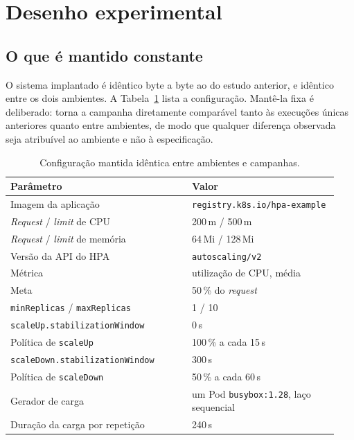 \documentclass[conference]{IEEEtran}
\begin{document}
\section{Desenho experimental}
\label{sec:desenho}

\subsection{O que é mantido constante}

O sistema implantado é idêntico byte a byte ao do estudo anterior, e idêntico
entre os dois ambientes. A Tabela~\ref{tab:config} lista a configuração.
Mantê-la fixa é deliberado: torna a campanha diretamente comparável tanto às
execuções únicas anteriores quanto entre ambientes, de modo que qualquer
diferença observada seja atribuível ao ambiente e não à especificação.

\begin{table}[!t]
\centering
\caption{Configuração mantida idêntica entre ambientes e campanhas.}
\label{tab:config}
\footnotesize
\begin{tabular}{@{}p{0.52\linewidth}p{0.42\linewidth}@{}}
\toprule
\textbf{Parâmetro} & \textbf{Valor}\\
\midrule
Imagem da aplicação & \texttt{registry.k8s.io/\allowbreak hpa-example}\\
\emph{Request} / \emph{limit} de CPU & 200\,m / 500\,m\\
\emph{Request} / \emph{limit} de memória & 64\,Mi / 128\,Mi\\
Versão da API do HPA & \texttt{autoscaling/v2}\\
Métrica & utilização de CPU, média\\
Meta & 50\,\% do \emph{request}\\
\texttt{minReplicas} / \texttt{maxReplicas} & 1 / 10\\
\texttt{scaleUp.\allowbreak stabilizationWindow} & 0\,s\\
Política de \texttt{scaleUp} & 100\,\% a cada 15\,s\\
\texttt{scaleDown.\allowbreak stabilizationWindow} & 300\,s\\
Política de \texttt{scaleDown} & 50\,\% a cada 60\,s\\
Gerador de carga & um Pod \texttt{busybox:1.28}, laço sequencial\\
Duração da carga por repetição & 240\,s\\
\bottomrule
\end{tabular}
\end{table}
\end{document}
